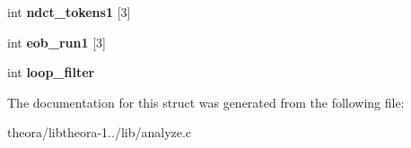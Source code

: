 \begin{DoxyCompactItemize}
\item 
\hypertarget{structoc__enc__pipeline__state_abbf223f4179b5e743bf453c745553998}{int {\bfseries ndct\+\_\+tokens1} \mbox{[}3\mbox{]}}\label{structoc__enc__pipeline__state_abbf223f4179b5e743bf453c745553998}

\item 
\hypertarget{structoc__enc__pipeline__state_a554e9d66915ac9e96efdf807f618719b}{int {\bfseries eob\+\_\+run1} \mbox{[}3\mbox{]}}\label{structoc__enc__pipeline__state_a554e9d66915ac9e96efdf807f618719b}

\item 
\hypertarget{structoc__enc__pipeline__state_ad53680de034de1d7a74030e4309259c2}{int {\bfseries loop\+\_\+filter}}\label{structoc__enc__pipeline__state_ad53680de034de1d7a74030e4309259c2}

\end{DoxyCompactItemize}


The documentation for this struct was generated from the following file\+:\begin{DoxyCompactItemize}
\item 
theora/libtheora-\/1../lib/analyze.\+c\end{DoxyCompactItemize}
